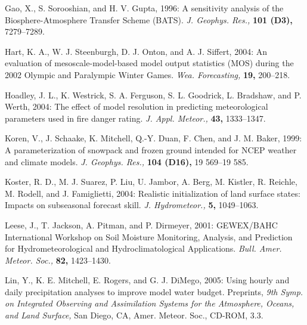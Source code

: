 \documentclass[twocolumn]{article}
\begin{document}
\begin{references}
{\item Gao, X., S. Sorooshian, and H. V. Gupta, 1996: A sensitivity analysis of the Biosphere-Atmosphere Transfer Scheme (BATS). \textit{J. Geophys. Res.,} \textbf{101 (D3),} 7279--7289.

\item Hart, K. A., W. J. Steenburgh, D. J. Onton, and A. J. Siffert, 2004: An evaluation of mesoscale-model-based model output statistics (MOS) during the 2002 Olympic and Paralympic Winter Games. \textit{Wea. Forecasting,} \textbf{19,} 200--218.

\item Hoadley, J. L., K. Westrick, S. A. Ferguson, S. L. Goodrick, L. Bradshaw, and P. Werth, 2004: The effect of model resolution in predicting meteorological parameters used in fire danger rating. \textit{J. Appl. Meteor.,} \textbf{43,} 1333--1347.


\item Koren, V., J. Schaake, K. Mitchell, Q.-Y. Duan, F. Chen, and J. M. Baker, 1999: A parameterization of snowpack and frozen ground intended for NCEP weather and climate models. \textit{J. Geophys. Res.,} \textbf{104 (D16),} 19 569--19 585.

\item Koster, R. D., M. J. Suarez, P. Liu, U. Jambor, A. Berg, M. Kistler, R. Reichle, M. Rodell, and J. Famiglietti, 2004: Realistic initialization of land surface states: Impacts on subseasonal forecast skill. \textit{J. Hydrometeor.,} \textbf{5,} 1049--1063.

\item Leese, J., T. Jackson, A. Pitman, and P. Dirmeyer, 2001: GEWEX/BAHC International Workshop on Soil Moisture Monitoring, Analysis, and Prediction for Hydrometeorological and Hydroclimatological Applications. \textit{Bull. Amer. Meteor. Soc.,} \textbf{82,} 1423--1430. 

\item Lin, Y., K. E. Mitchell, E. Rogers, and G. J. DiMego, 2005: Using hourly and daily precipitation analyses to improve model water budget. Preprints, \textit{9th Symp. on Integrated Observing and Assimilation Systems for the Atmosphere, Oceans, and Land Surface,} San Diego, CA, Amer. Meteor. Soc., CD-ROM, 3.3.

}
\end{references}
\end{document}
